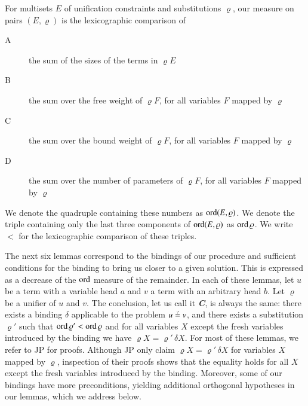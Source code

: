     \begin{defi}[$\jp D8$] \label{unif:def:ord}
    For multisets $E$ of unification constraints and
    substitutions $\varrho$, our measure on pairs $(E, \varrho)$
    is the lexicographic comparison of
    \begin{description}
      \item[A] the sum of the sizes of the terms in $\varrho E$
      \item[B] the sum over the free weight of $\varrho F$, 
        for all variables $F$ mapped by $\varrho$
      \item[C] the sum over the bound weight of $\varrho F$, 
      for all variables $F$ mapped by $\varrho$
      \item[D] the sum over the number of parameters of $\varrho F$, 
      for all variables $F$ mapped by $\varrho$
    \end{description}
    We denote the quadruple containing these numbers as $\operatorname{ord}(E,\varrho)$.
    We denote the triple containing only the last three components of $\operatorname{ord}(E,\varrho)$ as $\operatorname{ord} \varrho$.
    We write $<$ for the lexicographic comparison of these triples.
    \end{defi}

    The next six lemmas correspond to the bindings of our procedure and sufficient
    conditions for the binding to bring us closer to a given solution. 
    This is expressed as a decrease of the $\operatorname{ord}$ measure
    of the remainder. In each of these lemmas, 
    let $u$ be a term with a variable head $a$ and
    $v$ a term with an arbitrary head $b$.
    Let $\varrho$ be a unifier of $u$ and $v$.
    The conclusion, let us call it \textbf{\emph{C}},
    is always the same: there exists a binding $\delta$ applicable to the problem $ u\unif v$, and
    there exists a substitution $\varrho'$ such that $\operatorname{ord}\varrho'<\operatorname{ord}\varrho$
    and for all variables $X$ except the fresh variables introduced by the binding we have  $\varrho X= \varrho'\, \delta X$.
    For most of these lemmas, we refer to JP \cite{jp-76-unif} for proofs.
    Although JP only claim $\varrho X= \varrho'\, \delta X$
    for variables $X$ mapped by $\varrho$,
    inspection of their proofs shows that the equality holds for 
    all $X$ except the fresh variables introduced by the binding.
    Moreover, some of our bindings have more preconditions, 
    yielding additional orthogonal hypotheses in our lemmas,
    which we address below.

